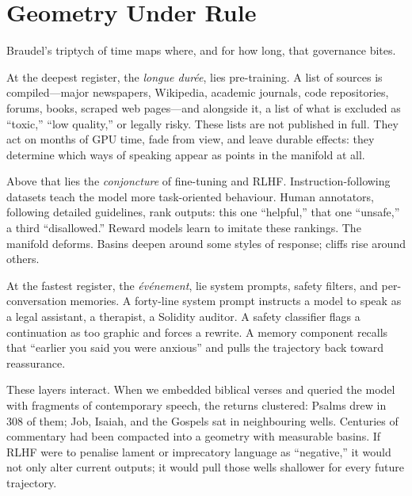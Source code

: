 \documentclass[12pt,a4paper]{article}
\begin{document}
\section{Geometry Under Rule}

Braudel's triptych of time maps where, and for how long, that governance bites.\cite{mtreview-rlhf-labor}

At the deepest register, the \emph{longue dur\'ee}, lies pre-training. A list of sources is compiled---major newspapers, Wikipedia, academic journals, code repositories, forums, books, scraped web pages---and alongside it, a list of what is excluded as ``toxic,'' ``low quality,'' or legally risky. These lists are not published in full. They act on months of GPU time, fade from view, and leave durable effects: they determine which ways of speaking appear as points in the manifold at all.

Above that lies the \emph{conjoncture} of fine-tuning and RLHF. Instruction-following datasets teach the model more task-oriented behaviour. Human annotators, following detailed guidelines, rank outputs: this one ``helpful,'' that one ``unsafe,'' a third ``disallowed.'' Reward models learn to imitate these rankings.\cite{christiano2017deep,bai2022constitutional} The manifold deforms. Basins deepen around some styles of response; cliffs rise around others.

At the fastest register, the \emph{\'ev\'enement}, lie system prompts, safety filters, and per-conversation memories. A forty-line system prompt instructs a model to speak as a legal assistant, a therapist, a Solidity auditor. A safety classifier flags a continuation as too graphic and forces a rewrite. A memory component recalls that ``earlier you said you were anxious'' and pulls the trajectory back toward reassurance.

These layers interact. When we embedded biblical verses and queried the model with fragments of contemporary speech, the returns clustered: Psalms drew in 308 of them; Job, Isaiah, and the Gospels sat in neighbouring wells. Centuries of commentary had been compacted into a geometry with measurable basins. If RLHF were to penalise lament or imprecatory language as ``negative,'' it would not only alter current outputs; it would pull those wells shallower for every future trajectory.
\end{document}
